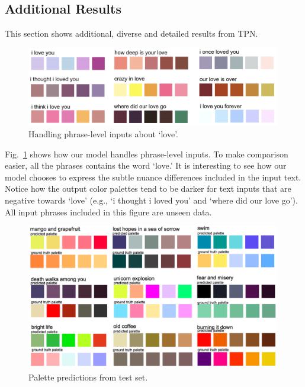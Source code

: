 \documentclass[runningheads]{llncs}
\begin{document}
\subsection{Additional Results}
This section shows additional, diverse and detailed results from TPN.  
\begin{figure}[h!]
\centering 
\includegraphics[width=0.99\textwidth]{./love_variations.png}
\vspace*{-2mm}\caption{Handling phrase-level inputs about `love'.}\label{fig:love_variations}
\end{figure}

Fig.~\ref{fig:love_variations} shows how our model handles phrase-level inputs. To make comparison easier, all the phrases contains the word `love.' It is interesting to see how our model chooses to express the subtle nuance differences included in the input text. Notice how the output color palettes tend to be darker for text inputs that are negative towards `love' (e.g., `i thought i loved you' and `where did our love go'). All input phrases included in this figure are unseen data.
\begin{figure}[h!]
\centering 
\includegraphics[width=0.99\textwidth]{./test_palettes.png}
\vspace*{-2mm}\caption{Palette predictions from test set.}\label{fig:test_palettes}
\end{figure}
\end{document}
